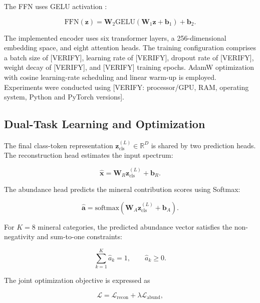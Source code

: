 \documentclass[runningheads]{llncs}
\begin{document}
The FFN uses GELU activation \cite{hendrycks2016gelu}:

\begin{equation}
\mathrm{FFN}(\mathbf{z})
=
\mathbf{W}_{2}
\mathrm{GELU}
\left(
\mathbf{W}_{1}\mathbf{z}+\mathbf{b}_{1}
\right)
+\mathbf{b}_{2}.
\label{eq:ffn}
\end{equation}

The implemented encoder uses six transformer layers, a
256-dimensional embedding space, and eight attention heads.
The training configuration comprises a batch size of
[VERIFY], learning rate of [VERIFY], dropout rate of [VERIFY],
weight decay of [VERIFY], and [VERIFY] training epochs.
AdamW optimization with cosine learning-rate scheduling and
linear warm-up is employed. Experiments were conducted using
[VERIFY: processor/GPU, RAM, operating system, Python and
PyTorch versions].

\subsection{Dual-Task Learning and Optimization}
\label{subsec:dual_task}

The final class-token representation
$\mathbf{z}_{\mathrm{cls}}^{(L)}\in\mathbb{R}^{D}$ is shared by
two prediction heads. The reconstruction head estimates the
input spectrum:

\begin{equation}
\hat{\mathbf{x}}
=
\mathbf{W}_{R}\mathbf{z}_{\mathrm{cls}}^{(L)}
+\mathbf{b}_{R}.
\label{eq:reconstruction}
\end{equation}

The abundance head predicts the mineral contribution scores using
Softmax:

\begin{equation}
\hat{\mathbf{a}}
=
\mathrm{softmax}
\left(
\mathbf{W}_{A}\mathbf{z}_{\mathrm{cls}}^{(L)}
+\mathbf{b}_{A}
\right).
\label{eq:abundance}
\end{equation}

For $K=8$ mineral categories, the predicted abundance vector
satisfies the non-negativity and sum-to-one constraints:

\begin{equation}
\sum_{k=1}^{K}\hat{a}_{k}=1,
\qquad
\hat{a}_{k}\geq0.
\label{eq:abundance_constraint}
\end{equation}

The joint optimization objective is expressed as

\begin{equation}
\mathcal{L}
=
\mathcal{L}_{\mathrm{recon}}
+
\lambda\mathcal{L}_{\mathrm{abund}},
\label{eq:joint_loss}
\end{equation}
\end{document}
